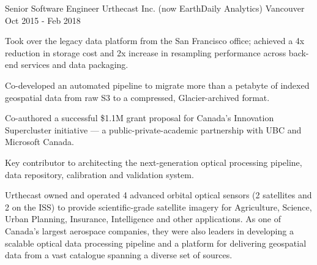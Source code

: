 \begin{cventries}

\cventrywithsummary
{Senior Software Engineer} %
{Urthecast Inc. (now EarthDaily Analytics)} %
{Vancouver} %
{Oct 2015 - Feb 2018} %
{
  \begin{cvitems} %
    \item {Took over the legacy data platform from the San Francisco office; achieved a 4x reduction in storage cost and 2x increase in resampling performance across back-end services and data packaging.}
    \item {Co-developed an automated pipeline to migrate more than a petabyte of indexed geospatial data from raw S3 to a compressed, Glacier-archived format.}
    \item {Co-authored a successful \$1.1M grant proposal for Canada's Innovation Supercluster initiative — a public-private-academic partnership with UBC and Microsoft Canada.}
    \item {Key contributor to architecting the next-generation optical processing pipeline, data repository, calibration and validation system.}
  \end{cvitems}
}
{
  Urthecast owned and operated 4 advanced orbital optical sensors (2 satellites and 2 on the ISS) to provide scientific-grade satellite imagery for Agriculture, Science, Urban Planning, Insurance, Intelligence and other applications. As one of Canada's largest aerospace companies, they were also leaders in developing a scalable optical data processing pipeline and a platform for delivering geospatial data from a vast catalogue spanning a diverse set of sources.
}


\end{cventries}
